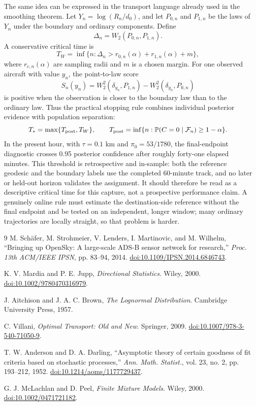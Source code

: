 \documentclass[10pt]{article}
\theoremstyle{aerostat}
\begin{document}
The same idea can be expressed in the transport language already used in the smoothing theorem. Let $Y_n=\log(R_n/d_0)$, and let $P_{0,n}$ and $P_{1,n}$ be the laws of $Y_n$ under the boundary and ordinary components. Define
\[
\Delta_n=W_2(P_{0,n},P_{1,n}).
\]
A conservative critical time is
\[
T_W=\inf\{n:\Delta_n>r_{0,n}(\alpha)+r_{1,n}(\alpha)+m\},
\]
where $r_{c,n}(\alpha)$ are sampling radii and $m$ is a chosen margin. For one observed aircraft with value $y_n$, the point-to-law score
\[
S_n(y_n)
=
W_2^2(\delta_{y_n},P_{1,n})
-W_2^2(\delta_{y_n},P_{0,n})
\]
is positive when the observation is closer to the boundary law than to the ordinary law. Thus the practical stopping rule combines individual posterior evidence with population separation:
\[
T_*=\max\{T_{\rm post},T_W\},
\qquad
T_{\rm post}=\inf\{n:\mathbb P(C=0\mid\mathcal F_n)\geq1-\alpha\}.
\]
In the present hour, with $\tau=0.1$ km and $\pi_0=53/1780$, the final-endpoint diagnostic crosses 0.95 posterior confidence after roughly forty-one elapsed minutes. This threshold is retrospective and in-sample: both the reference geodesic and the boundary labels use the completed 60-minute track, and no later or held-out horizon validates the assignment. It should therefore be read as a descriptive critical time for this capture, not a prospective performance claim. A genuinely online rule must estimate the destination-side reference without the final endpoint and be tested on an independent, longer window; many ordinary trajectories are locally straight, so that problem is harder.

\vspace{-3pt}
\begin{thebibliography}{9}\small
\setlength{\itemsep}{0pt}
\setlength{\parskip}{0pt}
M. Sch\"afer, M. Strohmeier, V. Lenders, I. Martinovic, and M. Wilhelm,
``Bringing up OpenSky: A large-scale ADS-B sensor network for research,''
\emph{Proc. 13th ACM/IEEE IPSN}, pp. 83--94, 2014.
\href{https://doi.org/10.1109/IPSN.2014.6846743}{doi:10.1109/IPSN.2014.6846743}.

K. V. Mardia and P. E. Jupp,
\emph{Directional Statistics}.
Wiley, 2000.
\href{https://doi.org/10.1002/9780470316979}{doi:10.1002/9780470316979}.

J. Aitchison and J. A. C. Brown,
\emph{The Lognormal Distribution}.
Cambridge University Press, 1957.

C. Villani,
\emph{Optimal Transport: Old and New}.
Springer, 2009.
\href{https://doi.org/10.1007/978-3-540-71050-9}{doi:10.1007/978-3-540-71050-9}.

T. W. Anderson and D. A. Darling,
``Asymptotic theory of certain goodness of fit criteria based on stochastic processes,''
\emph{Ann. Math. Statist.}, vol. 23, no. 2, pp. 193--212, 1952.
\href{https://doi.org/10.1214/aoms/1177729437}{doi:10.1214/aoms/1177729437}.

G. J. McLachlan and D. Peel,
\emph{Finite Mixture Models}.
Wiley, 2000.
\href{https://doi.org/10.1002/0471721182}{doi:10.1002/0471721182}.
\end{thebibliography}
\end{document}
